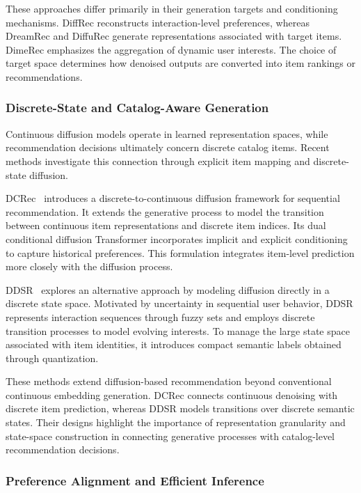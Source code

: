 \documentclass[sigconf,nonacm]{acmart}
\begin{document}
These approaches differ primarily in their
generation targets and conditioning mechanisms.
DiffRec reconstructs interaction-level preferences,
whereas DreamRec and DiffuRec generate
representations associated with target items.
DimeRec emphasizes the aggregation of dynamic
user interests. The choice of target space
determines how denoised outputs are converted
into item rankings or recommendations.

\subsubsection{Discrete-State and Catalog-Aware Generation}

Continuous diffusion models operate in learned
representation spaces, while recommendation
decisions ultimately concern discrete catalog
items. Recent methods investigate this connection
through explicit item mapping and discrete-state
diffusion.

DCRec~\cite{dcrec} introduces a discrete-to-continuous
diffusion framework for sequential recommendation.
It extends the generative process to model the
transition between continuous item representations
and discrete item indices. Its dual conditional
diffusion Transformer incorporates implicit and
explicit conditioning to capture historical
preferences. This formulation integrates
item-level prediction more closely with the
diffusion process.

DDSR~\cite{ddsr} explores an alternative approach
by modeling diffusion directly in a discrete
state space. Motivated by uncertainty in
sequential user behavior, DDSR represents
interaction sequences through fuzzy sets and
employs discrete transition processes to
model evolving interests. To manage the large
state space associated with item identities,
it introduces compact semantic labels obtained
through quantization.

These methods extend diffusion-based recommendation
beyond conventional continuous embedding
generation. DCRec connects continuous denoising
with discrete item prediction, whereas DDSR
models transitions over discrete semantic states.
Their designs highlight the importance of
representation granularity and state-space
construction in connecting generative processes
with catalog-level recommendation decisions.

\subsubsection{Preference Alignment and Efficient Inference}
\end{document}
